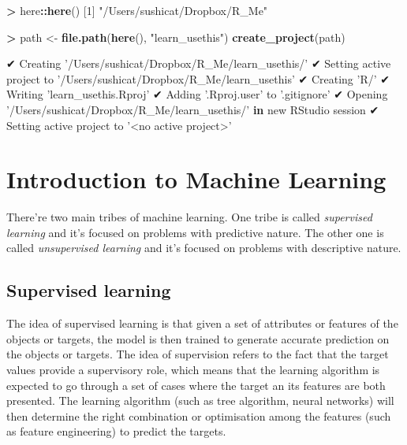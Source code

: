 \documentclass[]{book}
\newenvironment{Shaded}{\begin{snugshade}}{\end{snugshade}}
\newcommand{\ControlFlowTok}[1]{\textcolor[rgb]{0.13,0.29,0.53}{\textbf{#1}}}
\newcommand{\DecValTok}[1]{\textcolor[rgb]{0.00,0.00,0.81}{#1}}
\newcommand{\KeywordTok}[1]{\textcolor[rgb]{0.13,0.29,0.53}{\textbf{#1}}}
\newcommand{\NormalTok}[1]{#1}
\newcommand{\OperatorTok}[1]{\textcolor[rgb]{0.81,0.36,0.00}{\textbf{#1}}}
\newcommand{\StringTok}[1]{\textcolor[rgb]{0.31,0.60,0.02}{#1}}
\begin{document}
\begin{Shaded}
\begin{Highlighting}[]
\OperatorTok{>}\StringTok{ }\NormalTok{here}\OperatorTok{::}\KeywordTok{here}\NormalTok{()}
\NormalTok{[}\DecValTok{1}\NormalTok{] }\StringTok{"/Users/sushicat/Dropbox/R_Me"}
\end{Highlighting}
\end{Shaded}

\begin{Shaded}
\begin{Highlighting}[]
\OperatorTok{>}\StringTok{ }\NormalTok{path <-}\StringTok{ }\KeywordTok{file.path}\NormalTok{(}\KeywordTok{here}\NormalTok{(), }\StringTok{"learn_usethis"}\NormalTok{)}
\KeywordTok{create_project}\NormalTok{(path)}

\NormalTok{✔ Creating }\StringTok{'/Users/sushicat/Dropbox/R_Me/learn_usethis/'}
\NormalTok{✔ Setting active project to }\StringTok{'/Users/sushicat/Dropbox/R_Me/learn_usethis'}
\NormalTok{✔ Creating }\StringTok{'R/'}
\NormalTok{✔ Writing }\StringTok{'learn_usethis.Rproj'}
\NormalTok{✔ Adding }\StringTok{'.Rproj.user'}\NormalTok{ to }\StringTok{'.gitignore'}
\NormalTok{✔ Opening }\StringTok{'/Users/sushicat/Dropbox/R_Me/learn_usethis/'} \ControlFlowTok{in}\NormalTok{ new RStudio session}
\NormalTok{✔ Setting active project to }\StringTok{'<no active project>'}
\end{Highlighting}
\end{Shaded}

\hypertarget{introduction-to-machine-learning}{%
\chapter{Introduction to Machine Learning}\label{introduction-to-machine-learning}}

There're two main tribes of machine learning. One tribe is called \emph{supervised learning} and it's focused on problems with predictive nature. The other one is called \emph{unsupervised learning} and it's focused on problems with descriptive nature.

\hypertarget{supervised-learning}{%
\section{Supervised learning}\label{supervised-learning}}

The idea of supervised learning is that given a set of attributes or features of the objects or targets, the model is then trained to generate accurate prediction on the objects or targets. The idea of supervision refers to the fact that the target values provide a supervisory role, which means that the learning algorithm is expected to go through a set of cases where the target an its features are both presented. The learning algorithm (such as tree algorithm, neural networks) will then determine the right combination or optimisation among the features (such as feature engineering) to predict the targets.
\end{document}
